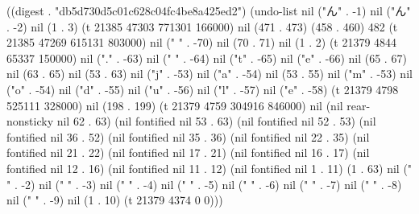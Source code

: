 
((digest . "db5d730d5c01c628c04fc4be8a425ed2") (undo-list nil ("ん" . -1) nil ("ん" . -2) nil (1 . 3) (t 21385 47303 771301 166000) nil (471 . 473) (458 . 460) 482 (t 21385 47269 615131 803000) nil ("%
" . -70) nil (70 . 71) nil (1 . 2) (t 21379 4844 65337 150000) nil ("." . -63) nil (" " . -64) nil ("t" . -65) nil ("e" . -66) nil (65 . 67) nil (63 . 65) nil (53 . 63) nil ("j" . -53) nil ("a" . -54) nil (53 . 55) nil ("m" . -53) nil ("o" . -54) nil ("d" . -55) nil ("u" . -56) nil ("l" . -57) nil ("e" . -58) (t 21379 4798 525111 328000) nil (198 . 199) (t 21379 4759 304916 846000) nil (nil rear-nonsticky nil 62 . 63) (nil fontified nil 53 . 63) (nil fontified nil 52 . 53) (nil fontified nil 36 . 52) (nil fontified nil 35 . 36) (nil fontified nil 22 . 35) (nil fontified nil 21 . 22) (nil fontified nil 17 . 21) (nil fontified nil 16 . 17) (nil fontified nil 12 . 16) (nil fontified nil 11 . 12) (nil fontified nil 1 . 11) (1 . 63) nil (" " . -2) nil (" " . -3) nil (" " . -4) nil (" " . -5) nil (" " . -6) nil (" " . -7) nil (" " . -8) nil (" " . -9) nil (1 . 10) (t 21379 4374 0 0)))

